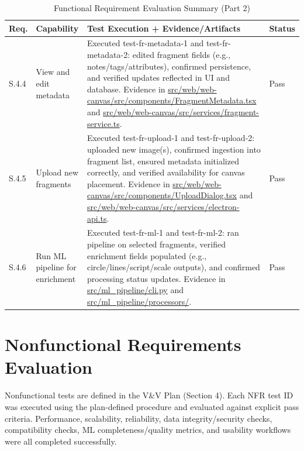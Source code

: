 \documentclass[12pt, titlepage]{article}
\begin{document}
\begin{table}[H]
\centering
\caption{Functional Requirement Evaluation Summary (Part 2)}
\label{tab:func-eval-2}
\begin{tabularx}{\textwidth}{
p{1.5cm}
>{\raggedright\arraybackslash}p{3.4cm}
>{\raggedright\arraybackslash}p{6.2cm}
p{2cm}
}
\toprule
\textbf{Req.} & \textbf{Capability} & \textbf{Test Execution + Evidence/Artifacts} & \textbf{Status}\\
\midrule

S.4.4 & View and edit metadata &
Executed test-fr-metadata-1 and test-fr-metadata-2: edited fragment fields (e.g., notes/tags/attributes), confirmed persistence, and verified updates reflected in UI and database. Evidence in \url{src/web/web-canvas/src/components/FragmentMetadata.tsx} and \url{src/web/web-canvas/src/services/fragment-service.ts}. &
Pass\\

S.4.5 & Upload new fragments &
Executed test-fr-upload-1 and test-fr-upload-2: uploaded new image(s), confirmed ingestion into fragment list, ensured metadata initialized correctly, and verified availability for canvas placement. Evidence in \url{src/web/web-canvas/src/components/UploadDialog.tsx} and \url{src/web/web-canvas/src/services/electron-api.ts}. &
Pass\\

S.4.6 & Run ML pipeline for enrichment &
Executed test-fr-ml-1 and test-fr-ml-2: ran pipeline on selected fragments, verified enrichment fields populated (e.g., circle/lines/script/scale outputs), and confirmed processing status updates. Evidence in \url{src/ml_pipeline/cli.py} and \url{src/ml_pipeline/processors/}. &
Pass\\

\bottomrule
\end{tabularx}
\end{table}


\section{Nonfunctional Requirements Evaluation}

Nonfunctional tests are defined in the V\&V Plan (Section 4). Each NFR test ID was executed using the plan-defined procedure and evaluated against explicit pass criteria. Performance, scalability, reliability, data integrity/security checks, compatibility checks, ML completeness/quality metrics, and usability workflows were all completed successfully.
\end{document}
